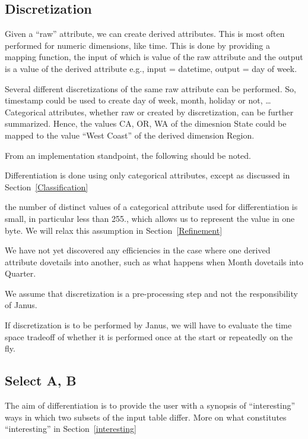 \subsection{Discretization}
\label{Discretization}

Given a ``raw'' attribute, we can create derived attributes. This is most often
performed for numeric dimensions, like time. This is done by providing a mapping
function, the input of which is value of the raw attribute and the output is a
value of the derived attribute e.g., input = datetime, output = day of week.

Several different discretizations of the same raw attribute can be performed.  So, timestamp could be used to create day of week, month, holiday or not, \ldots
Categorical attributes, whether raw or created by discretization, can be further
summarized. Hence, the values CA, OR, WA of the dimesnion State could be mapped to the value ``West Coast''  of the derived dimension Region.

From an implementation standpoint, the following should be noted.
\be
\item Differentiation is done using only categorical attributes, except
as discussed in Section~\ref{Classification}
\item the number of distinct values of a categorical 
attribute used for differentiation is small, in particular less than 255., which
allows us to represent the value in one byte. We will relax this assumption in
Section~\ref{Refinement}
\item 
We have not yet discovered any efficiencies in the case where one derived
attribute dovetails into another, such as what happens when Month 
dovetails into Quarter.
\item We assume that discretization is a pre-processing step and not the
responsibility of Janus.
\item If discretization is to be performed by Janus, we will have to evaluate
the time space tradeoff of whether it is performed once at the start or
repeatedly on the fly.
\ee


\subsection{Select A, B}
\label{SelectAB}

The aim of differentiation is to provide the user with a synopsis of
``interesting'' ways in which two subsets of the input table differ. 
More on what constitutes ``interesting'' in Section~\ref{interesting}

